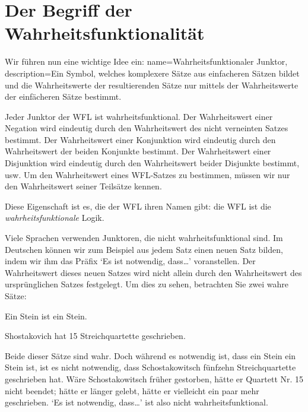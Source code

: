 \section{Der Begriff der Wahrheitsfunktionalität}
Wir führen nun eine wichtige Idee ein: 
{
name=Wahrheitsfunktionaler Junktor,
description={Ein Symbol, welches komplexere Sätze aus einfacheren Sätzen bildet und die \gls{Wahrheitswert}e der resultierenden Sätze nur mittels der Wahrheitswerte der einfächeren Sätze bestimmt.}
}
 
Jeder Junktor der WFL ist wahrheitsfunktional. Der Wahrheitswert einer Negation wird eindeutig durch den Wahrheitswert des nicht verneinten Satzes bestimmt. Der Wahrheitswert einer Konjunktion wird eindeutig durch den Wahrheitswert der beiden Konjunkte bestimmt. Der Wahrheitswert einer Disjunktion wird eindeutig durch den Wahrheitswert beider Disjunkte bestimmt, usw. Um den Wahrheitswert eines WFL-Satzes zu bestimmen, müssen wir nur den Wahrheitswert seiner Teilsätze kennen. 

Diese Eigenschaft ist es, die der WFL ihren Namen gibt: die WFL ist die \emph{wahrheitsfunktionale} Logik.

Viele Sprachen verwenden Junktoren, die nicht wahrheitsfunktional sind. Im Deutschen können wir zum Beispiel aus jedem Satz einen neuen Satz bilden, indem wir ihm das Präfix `Es ist notwendig, dass\dots' voranstellen. Der Wahrheitswert dieses neuen Satzes wird nicht allein durch den Wahrheitswert des ursprünglichen Satzes festgelegt. Um dies zu sehen, betrachten Sie zwei wahre Sätze: 
	\begin{earg}
		\item Ein Stein ist ein Stein.
		\item Shostakovich hat 15 Streichquartette geschrieben.
	\end{earg}
Beide dieser Sätze sind wahr. Doch während es notwendig ist, dass ein Stein ein Stein ist, ist es nicht notwendig, dass Schostakowitsch fünfzehn Streichquartette geschrieben hat. Wäre Schostakowitsch früher gestorben, hätte er Quartett Nr. 15 nicht beendet; hätte er länger gelebt, hätte er vielleicht ein paar mehr geschrieben. `Es ist notwendig, dass\dots' ist also nicht wahrheitsfunktional. 

